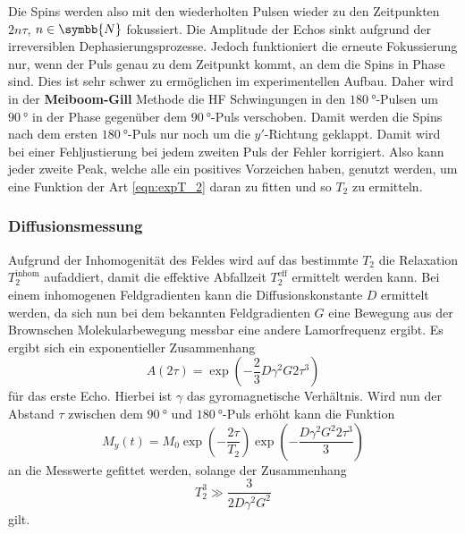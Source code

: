         \noindent Die Spins werden also mit den wiederholten Pulsen wieder zu den Zeitpunkten $2 n \tau$, $n\in \symbb{N}$ fokussiert. Die Amplitude der Echos sinkt aufgrund der irreversiblen Dephasierungsprozesse. 
        Jedoch funktioniert die erneute Fokussierung nur, wenn der Puls genau zu dem Zeitpunkt kommt, an dem die Spins in Phase sind. Dies ist sehr schwer zu ermöglichen im experimentellen Aufbau. 
        Daher wird in der \textbf{Meiboom-Gill} Methode die HF Schwingungen in den $\SI{180}{\degree}$-Pulsen um $\SI{90}{\degree}$ in der Phase gegenüber dem $\SI{90}{\degree}$-Puls verschoben. 
        Damit werden die Spins nach dem ersten $\SI{180}{\degree}$-Puls nur noch um die $y'$-Richtung geklappt. Damit wird bei einer Fehljustierung bei jedem zweiten Puls der Fehler korrigiert. Also kann 
        jeder zweite Peak, welche alle ein positives Vorzeichen haben, genutzt werden, um eine Funktion der Art \eqref{eqn:expT_2} daran zu fitten und so $T_2$ zu ermitteln.
        
    \subsubsection{Diffusionsmessung}

        \noindent Aufgrund der Inhomogenität des Feldes wird auf das bestimmte $T_2$ die Relaxation $T_2^{\text{inhom}}$ aufaddiert, damit die effektive Abfallzeit $T_2^{\text{eff}}$ ermittelt werden kann. 
        Bei einem inhomogenen Feldgradienten kann die Diffusionskonstante $D$ ermittelt werden, da sich nun bei dem bekannten Feldgradienten $G$ eine Bewegung aus der Brownschen Molekularbewegung messbar eine andere Lamorfrequenz ergibt. 
        Es ergibt sich ein exponentieller Zusammenhang 
        \begin{equation*}
            A ( 2 \tau ) = \exp(-\frac{2}{3} D \gamma^2 G2 \tau^3)
        \end{equation*}
        für das erste Echo. Hierbei ist $\gamma$ das gyromagnetische Verhältnis. 
        Wird nun der Abstand $\tau$ zwischen dem $\SI{90}{\degree}$ und $\SI{180}{\degree}$-Puls erhöht kann die Funktion 
        \begin{equation*}
            M_y (t) = M_0 \exp\left(- \frac{2 \tau}{T_2}\right)\exp\left(- \frac{D \gamma^2 G^2 2 \tau^3}{3}\right)
        \end{equation*}
        an die Messwerte gefittet werden, solange der Zusammenhang 
        \begin{equation*}
            T_2^3 \gg \frac{3}{2 D \gamma^2 G^2}
        \end{equation*}
        gilt. 


